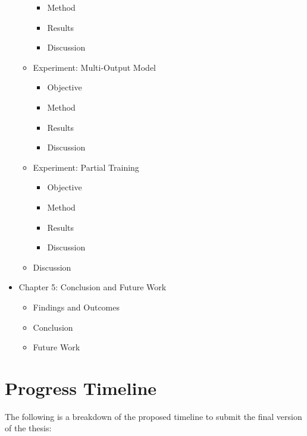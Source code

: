 \documentclass{article}
\begin{document}
\begin{itemize}
\begin{itemize}
\begin{itemize}
				\item Method
				\item Results
				\item Discussion
			\end{itemize}
			\item Experiment: Multi-Output Model
			\begin{itemize}
				\item Objective
				\item Method
				\item Results
				\item Discussion
			\end{itemize}
			\item Experiment: Partial Training
			\begin{itemize}
				\item Objective
				\item Method
				\item Results
				\item Discussion
			\end{itemize}
			\item Discussion
		\end{itemize}
		\item Chapter 5: Conclusion and Future Work
		\begin{itemize}
			\item Findings and Outcomes
			\item Conclusion
			\item Future Work
		\end{itemize}
	\end{itemize}
	
	\section{Progress Timeline}
	
	The following is a breakdown of the proposed timeline to submit the final version of the thesis:
	
\end{document}
